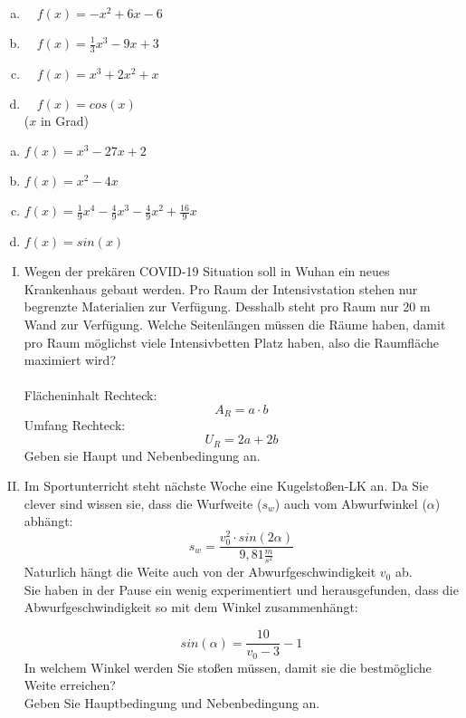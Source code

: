 \documentclass[a4paper,12pt]{article}
\newcommand{\Aufgabe}[2]{
	{
		\vspace*{0.3cm}
		\begin{tcolorbox}[breakable,colback=yellow!0,colframe=black!65!black,title=\textbf{Aufgabe #1:},width=\linewidth ]
			{#2}
		\end{tcolorbox}
		
		
	}
}
\begin{document}
	\Aufgabe{8\quad Finde die Extrempunkte der gegebenen Funktion}{
		\begin{multicols}{2}
			\begin{enumerate}[(a)]
				\item $\quad f(x)=-x^2 + 6x - 6$
				\item $\quad f(x)=\frac{1}{3}x^3 - 9 x + 3$
				\item $\quad f(x)=x^3 + 2x^2 + x$
				\item $\quad f(x)=cos(x)$\\
					($x$ in Grad)
			\end{enumerate}
		\end{multicols}
	}
	\Aufgabe{9\quad Gib das Monotonieverhalten der Funktionen an}{
		\begin{multicols}{2}
			\begin{enumerate}[(a)]
				\item $f(x)= x^3 - 27x + 2$
				\item $f(x)=x^2 - 4x$
				\item $f(x)=\frac{1}{9}  x^4 -\frac{4}{9}x^3 - \frac{4}{9}x^2 +\frac{16}{9}x$
				\item $f(x)=sin(x)$
			\end{enumerate}
		\end{multicols}
	}
	\Aufgabe{10\quad Anwendungsaufgaben}{
		\begin{enumerate}[(I)]
			\item Wegen der prekären COVID-19 Situation soll in Wuhan ein neues Krankenhaus gebaut werden. Pro Raum der Intensivstation stehen nur begrenzte Materialien zur Verfügung. Desshalb steht pro Raum nur 20 m Wand zur Verfügung.
			Welche Seitenlängen müssen die Räume haben, damit pro Raum möglichst viele Intensivbetten Platz haben, also die Raumfläche maximiert wird?\\\\
			Flächeninhalt Rechteck:
			\[A_R= a\cdot b\]
			Umfang Rechteck:
			\[U_R = 2a + 2b\]
			Geben sie Haupt und Nebenbedingung an.
			\item Im Sportunterricht steht nächste Woche eine Kugelstoßen-LK an. Da Sie clever sind wissen sie, dass die Wurfweite ($s_w$) auch vom Abwurfwinkel ($\alpha$) abhängt:
			\[s_w= \frac{v_0^2 \cdot sin(2\alpha)}{9,81 \frac{m}{s^2}}\]
			Naturlich hängt die Weite auch von der Abwurfgeschwindigkeit $v_0$ ab.\\
			Sie haben in der Pause ein wenig experimentiert und herausgefunden, dass die Abwurfgeschwindigkeit so mit dem Winkel zusammenhängt:
				
			\[sin(\alpha) = \frac{10}{v_0 - 3} - 1\]
			In welchem Winkel werden Sie stoßen müssen, damit sie die bestmögliche Weite erreichen?\\
			Geben Sie Hauptbedingung und Nebenbedingung an.
			
		\end{enumerate}
	}
\end{document}
